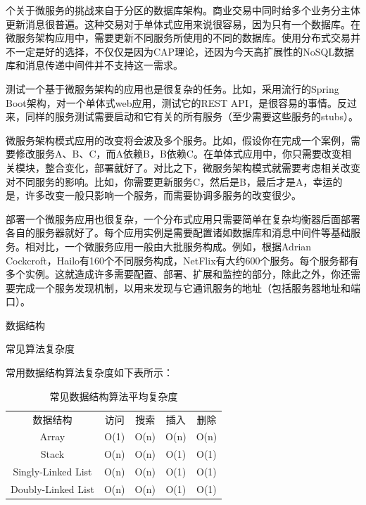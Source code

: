 \documentclass[8pt]{book}
\makeatletter
\numberwithin{dummy}{section}
\theoremstyle{ocrenumbox}
\theoremstyle{blacknumex}
\theoremstyle{blacknumbox}
\theoremstyle{ocrenum}
\renewcommand{\section}{\@startsection{section}{1}{\z@}
	{-4ex \@plus -1ex \@minus -.4ex}
	{1ex \@plus.2ex }
	{\normalfont\large\sffamily\bfseries}}
\renewcommand{\subsection}{\@startsection {subsection}{2}{\z@}
	{-3ex \@plus -0.1ex \@minus -.4ex}
	{0.5ex \@plus.2ex }
	{\normalfont\sffamily\bfseries}}
\makeatother
\begin{document}
个关于微服务的挑战来自于分区的数据库架构。商业交易中同时给多个业务分主体更新消息很普遍。这种交易对于单体式应用来说很容易，因为只有一个数据库。在微服务架构应用中，需要更新不同服务所使用的不同的数据库。使用分布式交易并不一定是好的选择，不仅仅是因为CAP理论，还因为今天高扩展性的NoSQL数据库和消息传递中间件并不支持这一需求。

测试一个基于微服务架构的应用也是很复杂的任务。比如，采用流行的Spring Boot架构，对一个单体式web应用，测试它的REST API，是很容易的事情。反过来，同样的服务测试需要启动和它有关的所有服务（至少需要这些服务的stubs）。


微服务架构模式应用的改变将会波及多个服务。比如，假设你在完成一个案例，需要修改服务A、B、C，而A依赖B，B依赖C。在单体式应用中，你只需要改变相关模块，整合变化，部署就好了。对比之下，微服务架构模式就需要考虑相关改变对不同服务的影响。比如，你需要更新服务C，然后是B，最后才是A，幸运的是，许多改变一般只影响一个服务，而需要协调多服务的改变很少。

部署一个微服务应用也很复杂，一个分布式应用只需要简单在复杂均衡器后面部署各自的服务器就好了。每个应用实例是需要配置诸如数据库和消息中间件等基础服务。相对比，一个微服务应用一般由大批服务构成。例如，根据Adrian Cockcroft，Hailo有160个不同服务构成，NetFlix有大约600个服务。每个服务都有多个实例。这就造成许多需要配置、部署、扩展和监控的部分，除此之外，你还需要完成一个服务发现机制，以用来发现与它通讯服务的地址（包括服务器地址和端口）。

\section{数据结构}

\subsection{常见算法复杂度}

常用数据结构算法复杂度如下表所示：


\begin{table}[htbp]
	\caption{常见数据结构算法平均复杂度}
	\label{table:mapo}
	\begin{center}
		\begin{tabular}{ccccc}
			\hline
			\multirow{1}{*}{数据结构}
			& \multicolumn{1}{c}{访问} 
			& \multicolumn{1}{c}{搜索}
			& \multicolumn{1}{c}{插入}
			& \multicolumn{1}{c}{删除}\\			
			\cline{1-5}
			Array &  O(1)  &  O(n) & O(n) & O(n)\\
			\hline
			Stack & O(n) & O(n) & O(1) & O(1) \\
			\hline
			Singly-Linked List &  O(n) & O(n) & O(1) & O(1) \\
			\hline	
			Doubly-Linked List & O(n) & O(n) & O(1) &  O(1)\\
			\hline						
		\end{tabular}	
	\end{center}
\end{table}
\end{document}
